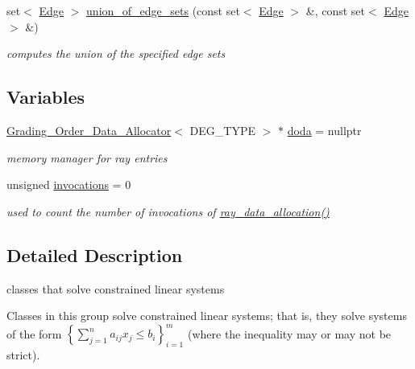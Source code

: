 \begin{DoxyCompactItemize}
set$<$ \hyperlink{group___c_l_s_solvers_class_l_p___solvers_1_1_edge}{Edge} $>$ \hyperlink{group___c_l_s_solvers_ga8b57096f9dac0f00912dd248cfdc89db}{union\+\_\+of\+\_\+edge\+\_\+sets} (const set$<$ \hyperlink{group___c_l_s_solvers_class_l_p___solvers_1_1_edge}{Edge} $>$ \&, const set$<$ \hyperlink{group___c_l_s_solvers_class_l_p___solvers_1_1_edge}{Edge} $>$ \&)
\begin{DoxyCompactList}\small\item\em computes the union of the specified edge sets \end{DoxyCompactList}\end{DoxyCompactItemize}
\subsection*{Variables}
\begin{DoxyCompactItemize}
\item 
\hyperlink{group__memorygroup_class_grading___order___data___allocator}{Grading\+\_\+\+Order\+\_\+\+Data\+\_\+\+Allocator}$<$ D\+E\+G\+\_\+\+T\+Y\+PE $>$ $\ast$ \hyperlink{group__memorygroup_ga0dc763860167cb9a6e5c84bfda9a456e}{doda} = nullptr
\begin{DoxyCompactList}\small\item\em memory manager for ray entries \end{DoxyCompactList}\item 
\mbox{\label{namespace_l_p___solvers_a389e3d1ce5c76dad0e21f232ab720a84}} 
unsigned \hyperlink{namespace_l_p___solvers_a389e3d1ce5c76dad0e21f232ab720a84}{invocations} = 0
\begin{DoxyCompactList}\small\item\em used to count the number of invocations of \hyperlink{namespace_l_p___solvers_a7e1accee51d4f9339ef83bf93d653544}{ray\+\_\+data\+\_\+allocation()} \end{DoxyCompactList}\end{DoxyCompactItemize}


\subsection{Detailed Description}
classes that solve constrained linear systems 

Classes in this group solve constrained linear systems; that is, they solve systems of the form $\left\{\sum_{j=1}^na_{ij}x_j\leq b_i\right\}_{i=1}^m$ (where the inequality may or may not be strict). 

